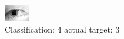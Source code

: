 \begin{figure}[h!]
\begin{center}
\includegraphics[width=0.60\columnwidth]{figures/ID1298_class_4_target_3.png}
\end{center}
\caption{ Classification: 4 actual target: 3}
\label{fig:ID1298_class_4_target_3}
\end{figure}
